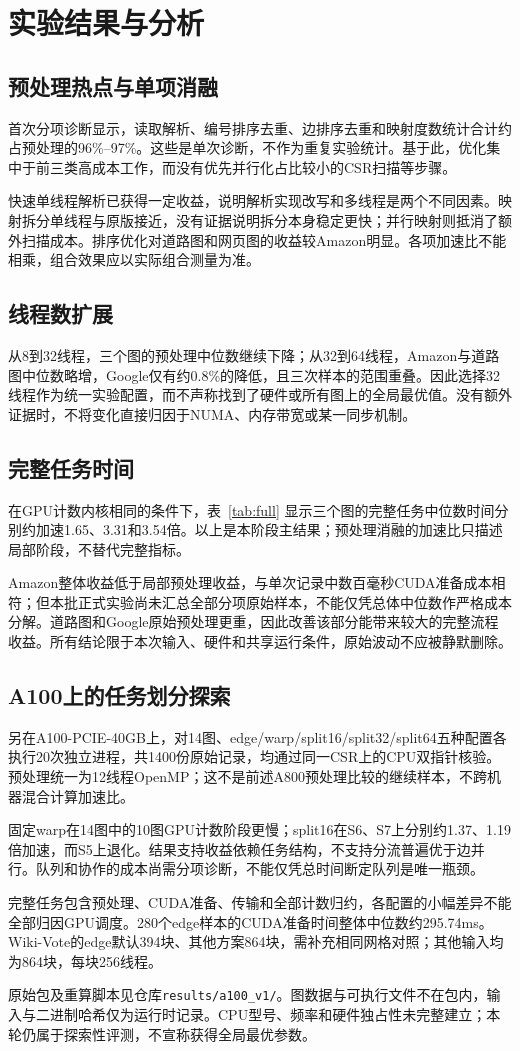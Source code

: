 \section{实验结果与分析}
\subsection{预处理热点与单项消融}
首次分项诊断显示，读取解析、编号排序去重、边排序去重和映射度数统计合计约占预处理的96\%--97\%。这些是单次诊断，不作为重复实验统计。基于此，优化集中于前三类高成本工作，而没有优先并行化占比较小的CSR扫描等步骤。


快速单线程解析已获得一定收益，说明解析实现改写和多线程是两个不同因素。映射拆分单线程与原版接近，没有证据说明拆分本身稳定更快；并行映射则抵消了额外扫描成本。排序优化对道路图和网页图的收益较Amazon明显。各项加速比不能相乘，组合效果应以实际组合测量为准。

\subsection{线程数扩展}

从8到32线程，三个图的预处理中位数继续下降；从32到64线程，Amazon与道路图中位数略增，Google仅有约0.8\%的降低，且三次样本的范围重叠。因此选择32线程作为统一实验配置，而不声称找到了硬件或所有图上的全局最优值。没有额外证据时，不将变化直接归因于NUMA、内存带宽或某一同步机制。

\subsection{完整任务时间}

在GPU计数内核相同的条件下，表~\ref{tab:full} 显示三个图的完整任务中位数时间分别约加速1.65、3.31和3.54倍。以上是本阶段主结果；预处理消融的加速比只描述局部阶段，不替代完整指标。

Amazon整体收益低于局部预处理收益，与单次记录中数百毫秒CUDA准备成本相符；但本批正式实验尚未汇总全部分项原始样本，不能仅凭总体中位数作严格成本分解。道路图和Google原始预处理更重，因此改善该部分能带来较大的完整流程收益。所有结论限于本次输入、硬件和共享运行条件，原始波动不应被静默删除。

\subsection{A100上的任务划分探索}
另在A100-PCIE-40GB上，对14图、edge/warp/split16/split32/split64五种配置各执行20次独立进程，共1400份原始记录，均通过同一CSR上的CPU双指针核验。预处理统一为12线程OpenMP；这不是前述A800预处理比较的继续样本，不跨机器混合计算加速比。

固定warp在14图中的10图GPU计数阶段更慢；split16在S6、S7上分别约1.37、1.19倍加速，而S5上退化。结果支持收益依赖任务结构，不支持分流普遍优于边并行。队列和协作的成本尚需分项诊断，不能仅凭总时间断定队列是唯一瓶颈。

完整任务包含预处理、CUDA准备、传输和全部计数归约，各配置的小幅差异不能全部归因GPU调度。280个edge样本的CUDA准备时间整体中位数约295.74ms。Wiki-Vote的edge默认394块、其他方案864块，需补充相同网格对照；其他输入均为864块，每块256线程。

原始包及重算脚本见仓库\texttt{results/a100\_v1/}。图数据与可执行文件不在包内，输入与二进制哈希仅为运行时记录。CPU型号、频率和硬件独占性未完整建立；本轮仍属于探索性评测，不宣称获得全局最优参数。
